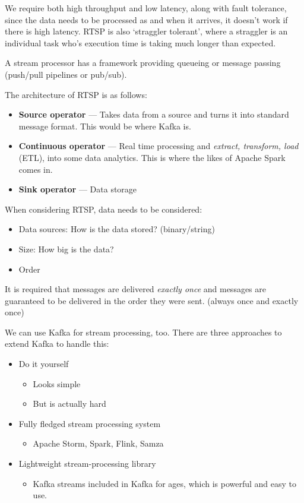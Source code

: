 \documentclass[11pt,a4paper,titlepage,dvipsnames,cmyk]{scrartcl}
\begin{document}
We require both high throughput and low latency, along with fault tolerance, since the data needs to be processed as and when it arrives, it doesn't work if there is high latency. RTSP is also `straggler tolerant', where a straggler is an individual task who's execution time is taking much longer than expected.

A stream processor has a framework providing queueing or message passing (push/pull pipelines or pub/sub).

The architecture of RTSP is as follows:
\begin{itemize}
    \item \textbf{Source operator} --- Takes data from a source and turns it into standard message format. This would be where Kafka is.
    \item \textbf{Continuous operator} --- Real time processing and \textit{extract, transform, load} (ETL), into some data analytics. This is where the likes of Apache Spark comes in.
    \item \textbf{Sink operator} --- Data storage
\end{itemize}


When considering RTSP, data needs to be considered:
\begin{itemize}
    \item Data sources: How is the data stored? (binary/string)
    \item Size: How big is the data?
    \item Order
\end{itemize}

It is required that messages are delivered \textit{exactly once} and messages are guaranteed to be delivered in the order they were sent. (always once and exactly once)

We can use Kafka for stream processing, too. There are three approaches to extend Kafka to handle this:
\begin{itemize}
    \item Do it yourself
    \begin{itemize}
        \item Looks simple
        \item But is actually hard
    \end{itemize}
    \item Fully fledged stream processing system
    \begin{itemize}
        \item Apache Storm, Spark, Flink, Samza
    \end{itemize}
    \item Lightweight stream-processing library
    \begin{itemize}
        \item Kafka streams included in Kafka for ages, which is powerful and easy to use.
    \end{itemize}
\end{itemize}
\end{document}
